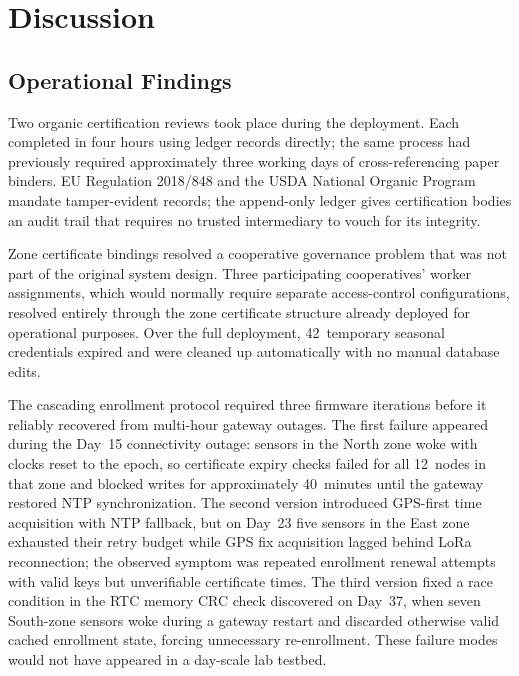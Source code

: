 \documentclass[a4paper,fleqn]{cas-dc}
\begin{document}
\section{Discussion}
\label{sec:discussion}

\subsection{Operational Findings}
\label{subsec:ops}

Two organic certification reviews took place during the deployment.
Each completed in four hours using ledger records directly; the same
process had previously required approximately three working days of
cross-referencing paper binders. EU Regulation 2018/848 and the USDA
National Organic Program~\cite{eu2018_848,usda_nop} mandate
tamper-evident records; the append-only ledger gives certification
bodies an audit trail that requires no trusted intermediary to vouch for
its integrity.

Zone certificate bindings resolved a cooperative governance problem
that was not part of the original system design. Three participating
cooperatives' worker assignments, which would normally require separate
access-control configurations, resolved entirely through the zone
certificate structure already deployed for operational purposes.
Over the full deployment, 42~temporary seasonal credentials expired and
were cleaned up automatically with no manual database edits.

The cascading enrollment protocol required three firmware iterations
before it reliably recovered from multi-hour gateway outages. The first
failure appeared during the Day~15 connectivity outage: sensors in the
North zone woke with clocks reset to the epoch, so certificate expiry
checks failed for all 12~nodes in that zone and blocked writes for
approximately 40~minutes until the gateway restored NTP synchronization.
The second version introduced GPS-first time acquisition with NTP
fallback, but on Day~23 five sensors in the East zone exhausted their
retry budget while GPS fix acquisition lagged behind LoRa reconnection;
the observed symptom was repeated enrollment renewal attempts with valid
keys but unverifiable certificate times. The third version fixed a race
condition in the RTC memory CRC check discovered on Day~37, when seven
South-zone sensors woke during a gateway restart and discarded otherwise
valid cached enrollment state, forcing unnecessary re-enrollment. These
failure modes would not have appeared in a day-scale lab testbed.
\end{document}
